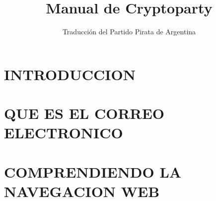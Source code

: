 \documentclass[oribibl,oneside,pdftext]{scrbook}
\begin{document}
\title{Manual de Cryptoparty}
\author{Traducción del Partido Pirata de Argentina}

\maketitle
\tableofcontents
\clearpage
\graphicspath{{./capitulo_01_INTRODUCCION/}}
\chapter{INTRODUCCION}
\clearpage

\clearpage

\clearpage

\clearpage

\clearpage

\clearpage

\graphicspath{{./capitulo_02_QUE_ES_EL_CORREO_ELECTRONICO/}}
\chapter{QUE ES EL CORREO ELECTRONICO}
\clearpage

\clearpage

\clearpage

\clearpage

\clearpage

\graphicspath{{./capitulo_03_COMPRENDIENDO_LA_NAVEGACION_WEB/}}
\chapter{COMPRENDIENDO LA NAVEGACION WEB}
\clearpage

\clearpage

\clearpage

\clearpage

\clearpage

\clearpage

\clearpage

\graphicspath{{./capitulo_04_PUBLICACION_Y_DISTRIBUCION/}}
\end{document}
